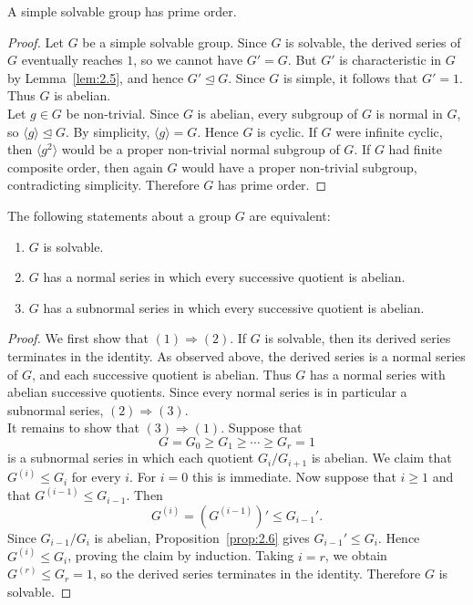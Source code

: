 \documentclass[../Odyssey_Project.tex]{subfiles}
\begin{document}
\begin{proposition}
\label{prop:11.1}
A simple solvable group has prime order.
\end{proposition}
\begin{proof}
    Let $G$ be a simple solvable group. Since $G$ is solvable, the derived series of $G$ eventually reaches $1$, so we cannot have $G' = G$. But $G'$ is characteristic in $G$ by Lemma~\ref{lem:2.5}, and hence $G' \trianglelefteq G$. Since $G$ is simple, it follows that $G' = 1$. Thus $G$ is abelian. \\
    Let $g \in G$ be non-trivial. Since $G$ is abelian, every subgroup of $G$ is normal in $G$, so $\langle g \rangle \trianglelefteq G$. By simplicity, $\langle g \rangle = G$. Hence $G$ is cyclic. If $G$ were infinite cyclic, then $\langle g^2 \rangle$ would be a proper non-trivial normal subgroup of $G$. If $G$ had finite composite order, then again $G$ would have a proper non-trivial subgroup, contradicting simplicity. Therefore $G$ has prime order.
\end{proof}

\begin{proposition}
\label{prop:11.2}
The following statements about a group $G$ are equivalent:
\begin{enumerate}
    \item[(1)] $G$ is solvable.
    \item[(2)] $G$ has a normal series in which every successive quotient is abelian.
    \item[(3)] $G$ has a subnormal series in which every successive quotient is abelian.
\end{enumerate}
\end{proposition}
\begin{proof}
    We first show that $(1) \Rightarrow (2)$. If $G$ is solvable, then its derived series terminates in the identity. As observed above, the derived series is a normal series of $G$, and each successive quotient is abelian. Thus $G$ has a normal series with abelian successive quotients. Since every normal series is in particular a subnormal series, $(2) \Rightarrow (3)$. \\
    It remains to show that $(3) \Rightarrow (1)$. Suppose that
    \[
        G = G_0 \geq G_1 \geq \cdots \geq G_r = 1
    \]
    is a subnormal series in which each quotient $G_i/G_{i+1}$ is abelian. We claim that $G^{(i)} \leq G_i$ for every $i$. For $i = 0$ this is immediate. Now suppose that $i \geq 1$ and that $G^{(i-1)} \leq G_{i-1}$. Then
    \[
        G^{(i)} = (G^{(i-1)})' \leq G_{i-1}'.
    \]
    Since $G_{i-1}/G_i$ is abelian, Proposition~\ref{prop:2.6} gives $G_{i-1}' \leq G_i$. Hence $G^{(i)} \leq G_i$, proving the claim by induction. Taking $i = r$, we obtain $G^{(r)} \leq G_r = 1$, so the derived series terminates in the identity. Therefore $G$ is solvable.
\end{proof}
\end{document}
